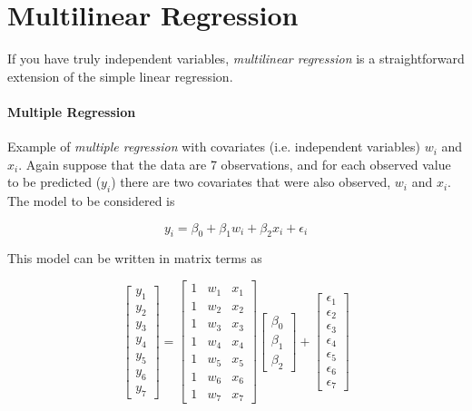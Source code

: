 \section{Multilinear Regression} 

If you have truly independent variables, \emph{multilinear regression} is a straightforward extension of the simple linear regression.

\paragraph{Multiple Regression} 
Example of \emph{multiple regression} with covariates (i.e. independent variables) $w_i$ and $x_i$.
Again suppose that the data are 7 observations, and for each observed value to be predicted ($y_i$) there are two covariates that were also observed, $w_i$ and $x_i$. The model to be considered is

\begin{equation}
  y_i = \beta_0 + \beta_1 w_i + \beta_2 x_i + \epsilon_i
\end{equation}

This model can be written in matrix terms as

\begin{equation}\label{eq:multipleRegression}
  \begin{bmatrix}y_1 \\ y_2 \\ y_3 \\ y_4 \\ y_5 \\ y_6 \\ y_7 \end{bmatrix} =
    \begin{bmatrix} 1 & w_1 & x_1  \\1 & w_2 & x_2  \\1 & w_3 & x_3  \\1 & w_4 & x_4  \\1 & w_5 & x_5  \\1 & w_6 & x_6 \\ 1& w_7  & x_7  \end{bmatrix}
    \begin{bmatrix} \beta_0 \\ \beta_1 \\ \beta_2  \end{bmatrix}
    +
    \begin{bmatrix} \epsilon_1 \\ \epsilon_2 \\ \epsilon_3 \\ \epsilon_4 \\ \epsilon_5 \\ \epsilon_6 \\ \epsilon_7 \end{bmatrix}
\end{equation}


